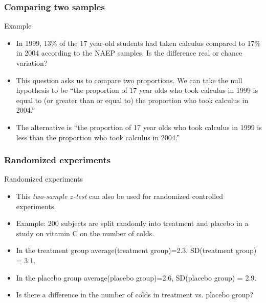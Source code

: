 \documentclass[handout]{beamer}
\begin{document}

   \begin{frame} \frametitle{Comparing two samples}

   \begin{block}
   {Example}
   \begin{itemize}
   \item In 1999, 13\% of the 17 year-old students had taken calculus
   compared to 17\% in 2004 according to the NAEP samples.
   Is the difference real or chance variation?

   \item This question asks us to compare two proportions. We can take
   the null hypothesis to be ``the proportion of 17 year olds who took
   calculus in 1999 is equal to (or greater than or equal to) the
   proportion who took calculus in 2004.''

   \item The alternative is ``the proportion of 17 year olds
   who took calculus in 1999 is less than the proportion who took calculus
   in 2004.''
   \end{itemize}
   \end{block}
   \end{frame}


   \begin{frame} \frametitle{Randomized experiments}

   \begin{block}
   {Randomized experiments}
   \begin{itemize}
   \item This {\em two-sample $z$-test} can also be used
   for randomized controlled experiments.

   \item Example:  200 subjects are split randomly into treatment
   and placebo in a study on vitamin C on the number of colds.

   \item In the treatment group average(treatment group)=2.3,
   SD(treatment group) = 3.1.

   \item In the placebo group average(placebo group)=2.6,
   SD(placebo group) = 2.9.

   \item Is there a difference in the number of colds in treatment
   vs. placebo group?


   \end{itemize}
   \end{block}
   \end{frame}
\end{document}
